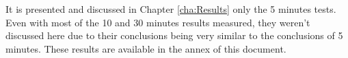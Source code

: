 


It is presented and discussed in Chapter \ref{cha:Results} only the 5 minutes tests. Even with most of the 10 and 30 minutes results measured, they weren't discussed here due to their conclusions being very similar to the conclusions of 5 minutes. These results are available in the annex of this document.




